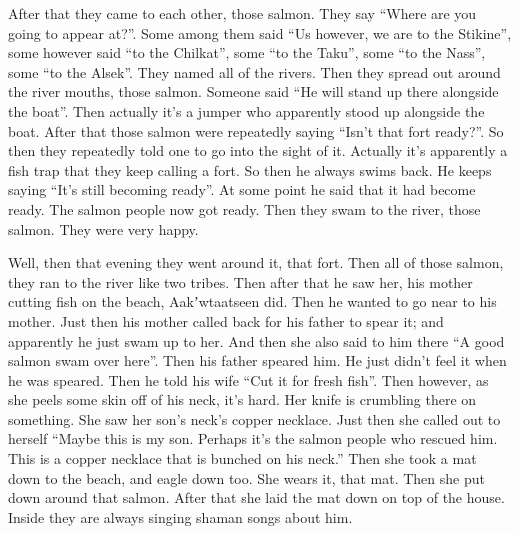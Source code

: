 \begin{pairs}
\begin{Rightside}
\pstart
{}After that they came to each other, those salmon.
They say
\qqk{}“Where are you going to appear at?”.
Some among them said “Us however, we are to the Stikine”,
some however said “to the Chilkat”,
some “to the Taku”,
some “to the Nass”,
some “to the Alsek”.
They named all of the rivers.
Then they spread out around the river mouths, those sal\-mon.
Someone said
\qqk{}“He will stand up there alongside the boat”.
Then actually it’s a jumper who apparently stood up alongside the boat.
After that those salmon were repeatedly saying
\qqk{}“Isn’t that fort ready?”.
So then they repeatedly told one to go into the sight of it.
Actually it’s apparently a fish trap that they keep calling a fort.
So then he always swims back.
He keeps saying
\qqk{}“It’s still becoming ready”.
At some point he said that it had become ready.
The salmon people now got ready.
Then they swam to the river, those salmon.
They were very happy.
\pend

\pstart
{}Well, then that evening they went around it, that fort.
Then all of those salmon, they ran to the river like two tribes.
Then after that he saw her, his mother cutting fish on the beach, Aakʼwtaatseen did.
Then he wanted to go near to his mother.
\!Just then his mother called back for his father to spear it;
and apparently he just swam up to her.
And then she also said to him there
\qqk{}“A good salmon swam over here”.
Then his father speared him.
He just didn’t feel it when he was speared.
Then he told his wife
\qqk{}“Cut it for fresh fish”.
Then however, as she peels some skin off of his neck, it’s hard.
Her knife is crumbling there on something.
She saw her son’s neck’s copper necklace.
\!Just then she called out to herself
\qqk{}“Maybe this is my son.
Perhaps it’s the salmon people who rescued him.
This is a copper necklace that is bunched on his neck.”
Then she took a mat down to the beach, and eagle down too.
She wears it, that mat.
Then she put down around that salmon.
After that she laid the mat down on top of the house.
Inside they are always singing shaman songs about him.
\pend


\end{Rightside}
\end{pairs}
